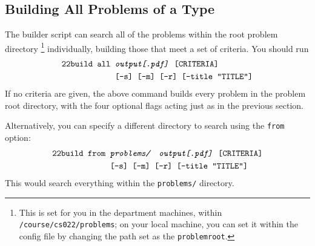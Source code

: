   \subsection{Building All Problems of a Type}
    The builder script can search all of the problems within the root 
    problem directory
    \footnote{This is set for you in the department machines, within 
    \texttt{/course/cs022/problems}; on your local machine, you can set it 
    within the config file by changing the path set as the 
    \texttt{problemroot}.} 
    individually, building those that meet a set of criteria. You should run
    \begin{align*}\texttt{22build }\texttt{all }&\texttt{\textit{output[.pdf]} [CRITERIA]}\\~&\texttt{[-s] [-m] [-r] [--title ``TITLE'']}\end{align*}
    If no criteria are given, the above command builds every problem in 
    the problem root directory, with the four optional flags acting just 
    as in the previous section.
    
    Alternatively, you can specify a different directory to search using 
    the \texttt{from} option:
    \begin{align*}\texttt{22build }\texttt{from }&\texttt{\textit{problems/\ \ output[.pdf]} [CRITERIA]}\\~&\texttt{[-s] [-m] [-r] [--title ``TITLE'']}\end{align*}
    This would search everything within the \texttt{problems/} directory.
    
